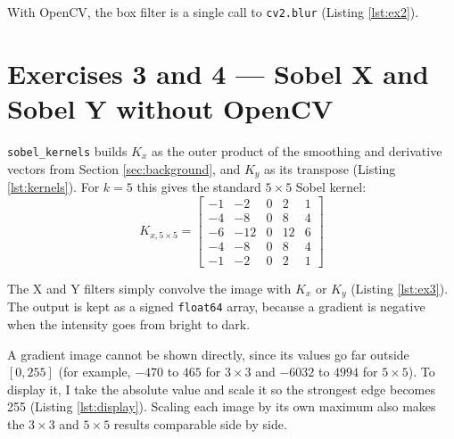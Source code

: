 With OpenCV, the box filter is a single call to \texttt{cv2.blur}
\citep{opencvfilters} (Listing \ref{lst:ex2}).




\section{Exercises 3 and 4 --- Sobel X and Sobel Y without OpenCV}
\label{sec:ex3}

\texttt{sobel\_kernels} builds $K_x$ as the outer product of the
smoothing and derivative vectors from Section \ref{sec:background}, and
$K_y$ as its transpose (Listing \ref{lst:kernels}). For $k=5$ this gives
the standard $5 \times 5$ Sobel kernel:
\begin{equation}
  K_{x,5\times5} =
  \begin{bmatrix}
    -1 & -2 & 0 & 2 & 1 \\
    -4 & -8 & 0 & 8 & 4 \\
    -6 & -12 & 0 & 12 & 6 \\
    -4 & -8 & 0 & 8 & 4 \\
    -1 & -2 & 0 & 2 & 1
  \end{bmatrix}
  \label{eq:sobel5}
\end{equation}



The X and Y filters simply convolve the image with $K_x$ or $K_y$
(Listing \ref{lst:ex3}). The output is kept as a signed \texttt{float64}
array, because a gradient is negative when the intensity goes from bright
to dark.



A gradient image cannot be shown directly, since its values go far
outside $[0, 255]$ (for example, $-470$ to $465$ for $3 \times 3$ and
$-6032$ to $4994$ for $5 \times 5$). To display it, I take the absolute
value and scale it so the strongest edge becomes 255 (Listing
\ref{lst:display}). Scaling each image by its own maximum also makes the
$3 \times 3$ and $5 \times 5$ results comparable side by side.

